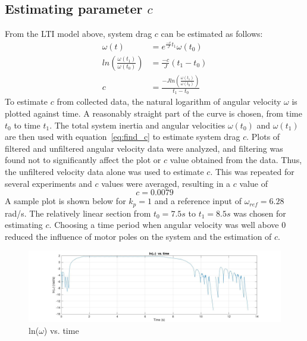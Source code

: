 \documentclass[11pt,titlepage]{article}
\begin{document}
    \subsection{Estimating parameter $c$}
    From the LTI model above, system drag $c$ can be estimated as follows:
        \begin{align}
            \omega(t)&=e^{\frac{-c}{J}t_1}\omega(t_0)\nonumber\\
            ln\left( \frac{\omega(t_1)}{\omega(t_0)}\right)&=\frac{-c}{J}(t_1-t_0)\nonumber\\
            c&=\frac{-Jln\left(\frac{\omega(t_1)}{\omega(t_0)}\right)}{t_1-t_0}\label{eq:find_c}
        \end{align}
        To estimate $c$ from collected data, the natural logarithm of angular velocity $\omega$ is plotted against time. A reasonably straight part of the curve is chosen, from time $t_0$ to time $t_1$. The total system inertia and angular velocities $\omega(t_0)$ and $\omega(t_1)$ are then used with equation~\ref{eq:find_c} to estimate system drag $c$. Plots of filtered and unfiltered angular velocity data were analyzed, and filtering was found not to significantly affect the plot or $c$ value obtained from the data. Thus, the unfiltered velocity data alone was used to estimate $c$. This was repeated for several experiments and $c$ values were averaged, resulting in a $c$ value of 
        \begin{equation}
            c=0.0079\nonumber
        \end{equation}
        A sample plot is shown below for $k_p=1$ and a reference input of $\omega_{ref}=6.28$ rad/s. The relatively linear section from $t_0=7.5s$ to $t_1=8.5s$ was chosen for estimating $c$. Choosing a time period when angular velocity was well above 0 reduced the influence of motor poles on the system and the estimation of $c$.
        
        \begin{figure}[h!]
            \centering
            \includegraphics[trim={6cm 0 0 0},clip,angle=0,origin=c,scale=0.3]{lnw_vs_time}
            \caption{ln($\omega$) vs. time}
            \label{fig:lnw_vs_time}
        \end{figure}
\end{document}

